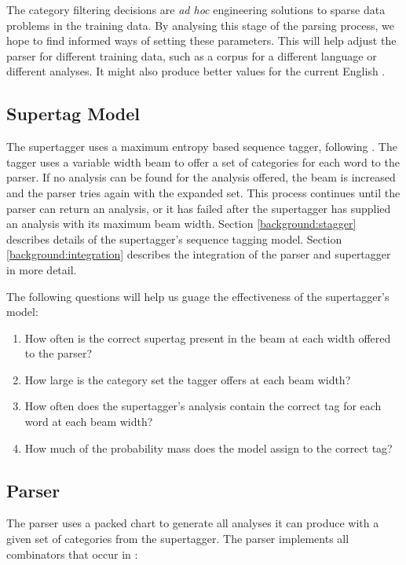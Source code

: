 The category filtering decisions are \emph{ad hoc} engineering solutions to sparse data problems in the \ccgbank training data. By analysing this stage of the parsing process, we hope to find informed ways of setting these parameters. This will help adjust the parser for different training data, such as a corpus for a different language or different \ccg analyses. It might also produce better values for the current English \ccgbank.

\subsection{Supertag Model}

The \candc supertagger uses a maximum entropy based sequence tagger, following \citet{ratnaparkhi}. The tagger uses a variable width beam to offer a set of categories for each word to the parser. If no analysis can be found for the analysis offered, the beam is increased and the parser tries again with the expanded set. This process continues until the parser can return an analysis, or it has failed after the supertagger has supplied an analysis with its maximum beam width. Section \ref{background:stagger} describes details of the supertagger's sequence tagging model. Section \ref{background:integration} describes the integration of the parser and supertagger in more detail.

The following questions will help us guage the effectiveness of the supertagger's model:

\begin{enumerate}
 \item How often is the correct supertag present in the beam at each width offered to the parser?
 \item How large is the category set the tagger offers at each beam width?
 \item How often does the supertagger's analysis contain the correct tag for each word at each beam width?
 \item How much of the probability mass does the model assign to the correct tag?
\end{enumerate}

\subsection{\ccg Parser}

The \candc parser uses a packed chart to generate all analyses it can produce with a given set of categories from the supertagger. The parser implements all \ccg combinators that occur in \ccgbank:

